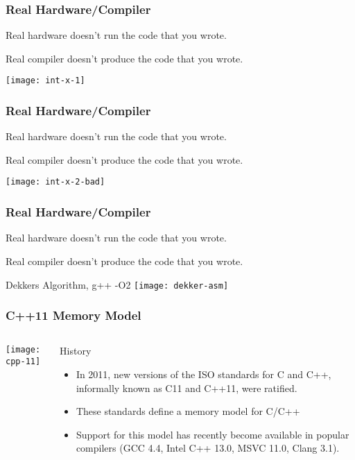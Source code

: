 \begin{frame}
    \frametitle{Real Hardware/Compiler}
    Real hardware doesn’t run the code that you wrote.
    
    Real compiler doesn’t produce the code that you wrote.
    
    \centering
    \texttt{[image: int-x-1]}

\end{frame}

\begin{frame}
    \frametitle{Real Hardware/Compiler}
    Real hardware doesn’t run the code that you wrote.
    
    Real compiler doesn’t produce the code that you wrote.
    
    \centering
    \texttt{[image: int-x-2-bad]}
    
\end{frame}
\begin{frame}
    \frametitle{Real Hardware/Compiler}
    Real hardware doesn’t run the code that you wrote.
    
    Real compiler doesn’t produce the code that you wrote.
    
    Dekkers Algorithm, g++ -O2
    \texttt{[image: dekker-asm]}
\end{frame}
\begin{frame}
    \frametitle{C++11 Memory Model}
    
    
    \begin{columns}
        
        \begin{column}{.4\textwidth}
            \texttt{[image: cpp-11]}
        \end{column}
        \begin{column}{.6\textwidth}
            
            \Large
            History
            \normalsize
            \begin{itemize}
                \item In 2011, new versions of the ISO standards for C and C++,
                informally known as C11 and C++11, were ratified.
                
                \item These standards define a memory model for C/C++
                \item Support for this model has recently become available in popular
                compilers (GCC 4.4, Intel C++ 13.0, MSVC 11.0, Clang 3.1).
                
                
                
            \end{itemize}
        \end{column}
    \end{columns}
    
\end{frame}


